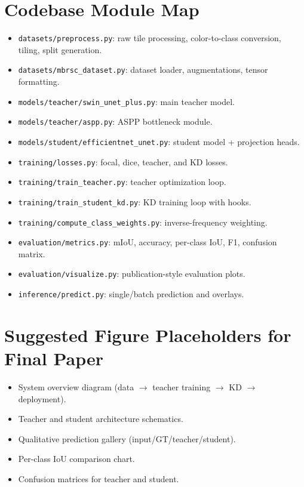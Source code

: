 \documentclass[journal]{IEEEtran}
\begin{document}
\section{Codebase Module Map}
\begin{itemize}
    \item \texttt{datasets/preprocess.py}: raw tile processing, color-to-class conversion, tiling, split generation.
    \item \texttt{datasets/mbrsc\_dataset.py}: dataset loader, augmentations, tensor formatting.
    \item \texttt{models/teacher/swin\_unet\_plus.py}: main teacher model.
    \item \texttt{models/teacher/aspp.py}: ASPP bottleneck module.
    \item \texttt{models/student/efficientnet\_unet.py}: student model + projection heads.
    \item \texttt{training/losses.py}: focal, dice, teacher, and KD losses.
    \item \texttt{training/train\_teacher.py}: teacher optimization loop.
    \item \texttt{training/train\_student\_kd.py}: KD training loop with hooks.
    \item \texttt{training/compute\_class\_weights.py}: inverse-frequency weighting.
    \item \texttt{evaluation/metrics.py}: mIoU, accuracy, per-class IoU, F1, confusion matrix.
    \item \texttt{evaluation/visualize.py}: publication-style evaluation plots.
    \item \texttt{inference/predict.py}: single/batch prediction and overlays.
\end{itemize}

\section{Suggested Figure Placeholders for Final Paper}
\begin{itemize}
    \item System overview diagram (data $\rightarrow$ teacher training $\rightarrow$ KD $\rightarrow$ deployment).
    \item Teacher and student architecture schematics.
    \item Qualitative prediction gallery (input/GT/teacher/student).
    \item Per-class IoU comparison chart.
    \item Confusion matrices for teacher and student.
\end{itemize}
\end{document}
